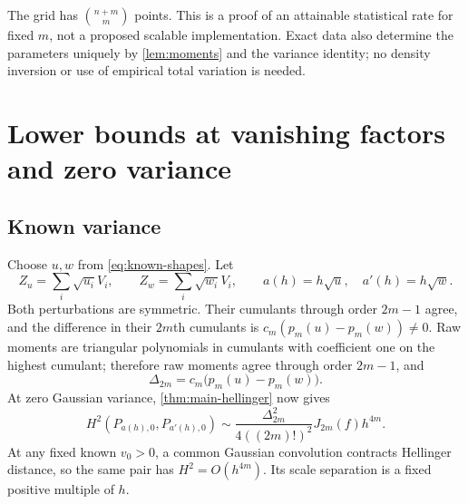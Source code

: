 \documentclass[11pt,a4paper]{article}
\numberwithin{equation}{section}
\theoremstyle{definition}
\theoremstyle{remark}
\begin{document}
The grid has $\binom{n+m}{m}$ points. This is a proof of an attainable
statistical rate for fixed $m$, not a proposed scalable implementation.
Exact data also determine the parameters uniquely by \cref{lem:moments}
and the variance identity; no density inversion or use of empirical total
variation is needed.

\section{Lower bounds at vanishing factors and zero variance}
\label{sec:lower}

\subsection{Known variance}
Choose $u,w$ from \eqref{eq:known-shapes}. Let
\[
 Z_u=\sum_i\sqrt{u_i}V_i,\qquad Z_w=\sum_i\sqrt{w_i}V_i,
 \qquad a(h)=h\sqrt u,\quad a'(h)=h\sqrt w.
\]
Both perturbations are symmetric. Their cumulants through order $2m-1$
agree, and the difference in their $2m$th cumulants is
$c_m(p_m(u)-p_m(w))\ne0$. Raw moments are triangular polynomials in
cumulants with coefficient one on the highest cumulant; therefore raw
moments agree through order $2m-1$, and
\begin{equation}
 \Delta_{2m}=c_m\bigl(p_m(u)-p_m(w)\bigr).
 \label{eq:delta-known}
\end{equation}
At zero Gaussian variance, \cref{thm:main-hellinger} now gives
\begin{equation}
 H^2(P_{a(h),0},P_{a'(h),0})
 \sim\frac{\Delta_{2m}^2}{4((2m)!)^2}J_{2m}(f)h^{4m}.
 \label{eq:H-known}
\end{equation}
At any fixed known $v_0>0$, a common Gaussian convolution contracts
Hellinger distance, so the same pair has $H^2=O(h^{4m})$.
Its scale separation is a fixed positive multiple of $h$.
\end{document}

